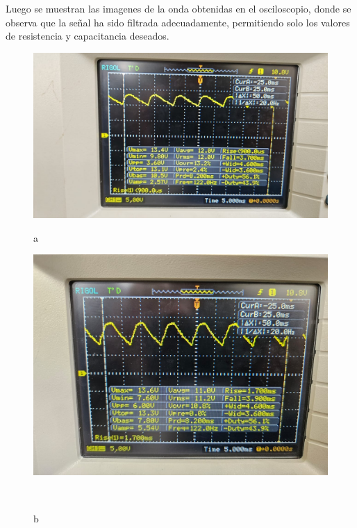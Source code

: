 \documentclass[10pt,letterpaper]{article}
\begin{document}
Luego se muestran las imagenes de la onda obtenidas en el osciloscopio,
donde se observa que la señal ha sido filtrada adecuadamente,
permitiendo solo los valores de resistencia y capacitancia deseados.
\begin{figure}[H]
    \centering
    \begin{minipage}[b]{0.45\textwidth}
        \centering
        \includegraphics[scale=0.2]{Filtrado0.jpg}
        \caption*{a}
    \end{minipage}
    \hfill
    \begin{minipage}[b]{0.45\textwidth}
        \centering
        \includegraphics[scale=0.15]{Filtrado7.jpg}
        \caption*{b}
    \end{minipage}
    \\


\end{figure}
\end{document}
